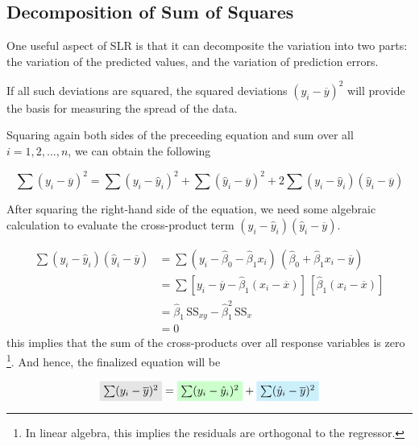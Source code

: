 \subsection{Decomposition of Sum of Squares}
One useful aspect of SLR is that it can decomposite the variation into two parts: 
the variation of the predicted values, and the variation of prediction errors.

If all such deviations are squared, the squared deviations $(y_i - \overline{y})^2$ will provide the 
basis for measuring the spread of the data.

Squaring again both sides of the preceeding equation and sum over all $i = 1, 2, ..., n$, we can obtain the 
following

\begin{equation}
    \sum (y_i - \overline{y})^2 = \sum(y_i - \hat{y}_i)^2 + \sum(\hat{y}_i - \overline{y})^2 + 2\sum(y_i - \hat{y}_i)(\hat{y}_i - \overline{y})
\end{equation}

After squaring the right-hand side of the equation, we need some algebraic calculation to evaluate the cross-product 
term $(y_i - \hat{y}_i)(\hat{y}_i - \overline{y})$.

\begin{align*}
    \sum(y_i - \hat{y}_i)(\hat{y}_i - \overline{y}) &= \sum(y_i - \hat{\beta}_0 - \hat{\beta}_1 x_i)\, (\hat{\beta}_0 + \hat{\beta}_1 x_i - \overline{y})\\
    &= \sum [y_i - \overline{y} - \hat{\beta}_1 (x_i - \overline{x})]\, [\hat{\beta}_1 (x_i - \overline{x})]\\[0.7em]
    &= \hat{\beta}_1 \, \text{SS}_{xy} - \hat{\beta}^2_1\, \text{SS}_{x}\\
    &= 0
\end{align*}
this implies that the sum of the cross-products over all response variables is zero 
\footnote{In linear algebra, this implies the residuals are orthogonal to the regressor.}. And hence, the finalized equation will be 

\begin{equation}
    \tikz[baseline]{
        \node[fill=gray!20,anchor=base] (t1)
        {$ \sum (y_i - \overline{y})^2 $}
    } = 
    \tikz[baseline]{
        \node[fill=green!20,anchor=base] (t2)
        {$ \sum(y_i - \hat{y}_i)^2 $}
    } + 
    \tikz[baseline]{
        \node[fill=cyan!20,anchor=base] (t3)
        {$ \sum(\hat{y}_i - \overline{y})^2 $}
    }
\end{equation}

